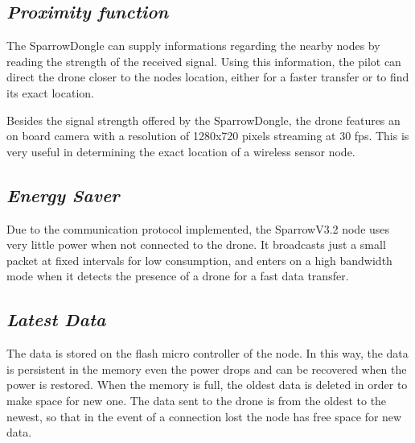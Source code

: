 \subsection{\textit{Proximity function}} 

\label{sec:prox}

The SparrowDongle can supply informations regarding the nearby nodes by reading the strength of the received signal. Using this information, the pilot can direct the drone closer to the nodes location, either for a faster transfer or to find its exact location. 

Besides the signal strength offered by the SparrowDongle, the drone features an on board camera with a resolution of 1280x720 pixels streaming at 30 fps. This is very useful in determining the exact location of a wireless sensor node.


\subsection{\textit{Energy Saver}} 

\label{sec:eng}

Due to the communication protocol implemented, the SparrowV3.2 node uses very little power when not connected to the drone. It broadcasts just a small packet at fixed intervals for low consumption, and enters on a high bandwidth mode when it detects the presence of a drone for a fast data transfer. 


\subsection{\textit{Latest Data}} 

\label{sec:data}

The data is stored on the flash micro controller of the node. In this way, the data is persistent in the memory even the power drops and can be recovered when the power is restored. When the memory is full, the oldest data is deleted in order to make space for new one. The data sent to the drone is from the oldest to the newest, so that in the event of a connection lost the node has free space for new data. 

 

 




